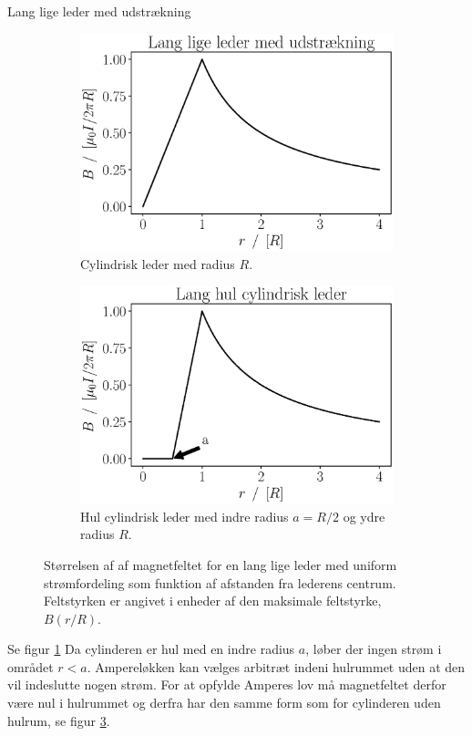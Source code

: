 \documentclass[crop=false, class=memoir]{standalone}
\begin{document}
\begin{opgave}{Lang lige leder med udstrækning}
\begin{figure}
\begin{subfigure}[t]{.47\textwidth}
            \includegraphics[width=\columnwidth]{Elektro/Elekfig/lange_lige_leder_cylinder.eps}
            \caption{Cylindrisk leder med radius $R$.}
            \label{fig:lang_lige_cylindrisk_leder}
        \end{subfigure}
        \hfill
        \begin{subfigure}[t]{.47\textwidth}
            \centering
            \includegraphics[width=\columnwidth]{Elektro/Elekfig/lange_lige_leder_hul_cylinder.eps}
            \caption{Hul cylindrisk leder med indre radius $a = R/2$ og ydre radius $R$.}
            \label{fig:lang_lige_hul_cylindrisk_leder}
        \end{subfigure}
        \caption{Størrelsen af af magnetfeltet for en lang lige leder med uniform strømfordeling som funktion af afstanden fra lederens centrum. Feltstyrken er angivet i enheder af den maksimale feltstyrke, $B(r/R)$.}
    \end{figure}
    \opg Se figur \ref{fig:lang_lige_cylindrisk_leder}
    \opg Da cylinderen er hul med en indre radius $a$, løber der ingen strøm i området $r<a$. Ampereløkken kan vælges arbitræt indeni hulrummet uden at den vil indeslutte nogen strøm. For at opfylde Amperes lov må magnetfeltet derfor være nul i hulrummet og derfra har den samme form som for cylinderen uden hulrum, se figur \ref{fig:lang_lige_hul_cylindrisk_leder}.
\end{opgave}
\end{document}
